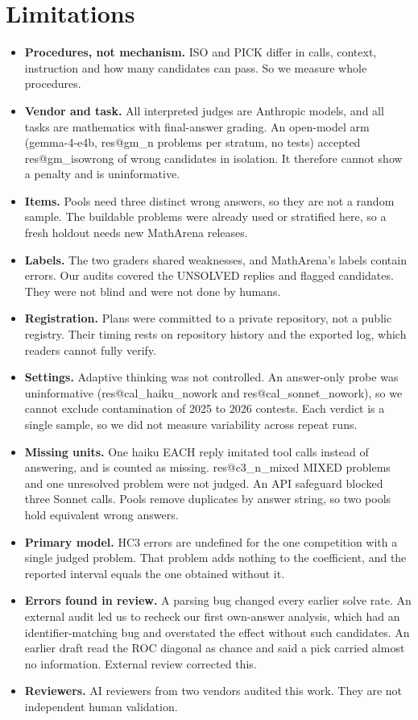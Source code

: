 \documentclass[10pt,twocolumn]{article}
\makeatletter
\newcommand{\res}[1]{\csname res@#1\endcsname}
\makeatother
\begin{document}
\section{Limitations}
\begin{itemize}\setlength{\itemsep}{2pt}
\item \textbf{Procedures, not mechanism.} ISO and PICK differ in calls, context, instruction and how many candidates can pass. So we measure whole procedures.
\item \textbf{Vendor and task.} All interpreted judges are Anthropic models, and all tasks are mathematics with final-answer grading. An open-model arm (gemma-4-e4b, \res{gm_n} problems per stratum, no tests) accepted \res{gm_isowrong} of wrong candidates in isolation. It therefore cannot show a penalty and is uninformative.
\item \textbf{Items.} Pools need three distinct wrong answers, so they are not a random sample. The buildable problems were already used or stratified here, so a fresh holdout needs new MathArena releases.
\item \textbf{Labels.} The two graders shared weaknesses, and MathArena's labels contain errors. Our audits covered the UNSOLVED replies and flagged candidates. They were not blind and were not done by humans.
\item \textbf{Registration.} Plans were committed to a private repository, not a public registry. Their timing rests on repository history and the exported log, which readers cannot fully verify.
\item \textbf{Settings.} Adaptive thinking was not controlled. An answer-only probe was uninformative (\res{cal_haiku_nowork} and \res{cal_sonnet_nowork}), so we cannot exclude contamination of 2025 to 2026 contests. Each verdict is a single sample, so we did not measure variability across repeat runs.
\item \textbf{Missing units.} One haiku EACH reply imitated tool calls instead of answering, and is counted as missing. \res{c3_n_mixed} MIXED problems and one unresolved problem were not judged. An API safeguard blocked three Sonnet calls. Pools remove duplicates by answer string, so two pools hold equivalent wrong answers.
\item \textbf{Primary model.} HC3 errors are undefined for the one competition with a single judged problem. That problem adds nothing to the coefficient, and the reported interval equals the one obtained without it.
\item \textbf{Errors found in review.} A parsing bug changed every earlier solve rate. An external audit led us to recheck our first own-answer analysis, which had an identifier-matching bug and overstated the effect without such candidates. An earlier draft read the ROC diagonal as chance and said a pick carried almost no information. External review corrected this.
\item \textbf{Reviewers.} AI reviewers from two vendors audited this work. They are not independent human validation.
\end{itemize}
\end{document}
